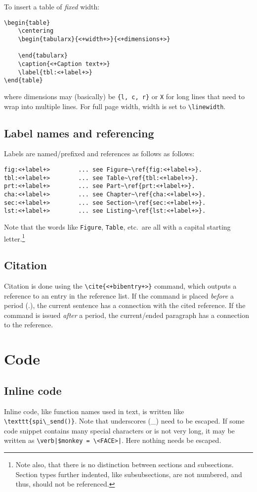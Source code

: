 To insert a table of \emph{fixed} width:
\begin{verbatim}
\begin{table}
    \centering
    \begin{tabularx}{<+width+>}{<+dimensions+>}

    \end{tabularx}
    \caption{<+Caption text+>}
    \label{tbl:<+label+>}
\end{table}
\end{verbatim}
where dimensions may (basically) be \texttt{\{l, c, r\}} or \texttt{X} for long lines that need to wrap into multiple lines. For full page width, width is set to \verb|\linewidth|.


\subsection{Label names and referencing}
Labels are named\slash prefixed and references as follows as follows:
\begin{verbatim}
fig:<+label+>        ... see Figure~\ref{fig:<+label+>}. 
tbl:<+label+>        ... see Table~\ref{tbl:<+label+>}.
prt:<+label+>        ... see Part~\ref{prt:<+label+>}.
cha:<+label+>        ... see Chapter~\ref{cha:<+label+>}.
sec:<+label+>        ... see Section~\ref{sec:<+label+>}.
lst:<+label+>        ... see Listing~\ref{lst:<+label+>}.
\end{verbatim}
Note that the words like \texttt{Figure}, \texttt{Table}, etc.\ are all with a capital starting letter.\footnote{Note also, that there is no distinction between sections and subsections. Section types further indented, like subsubsections, are not numbered, and thus, should not be referenced.}


\subsection{Citation}
Citation is done using the \verb|\cite{<+bibentry+>}| command, which outputs a reference to an entry in the reference list. If the command is placed \emph{before} a period (.), the current sentence has a connection with the cited reference. If the command is issued \emph{after} a period, the current\slash ended paragraph has a connection to the reference.


\section{Code}
\label{sec:code}
\subsection{Inline code}
Inline code, like function names used in text, is written like \verb|\texttt{spi\_send()}|. Note that underscores (\_) need to be escaped. If some code snippet contains many special characters or is not very long, it may be written as \verb#\verb|$monkey = \<FACE>|#. Here nothing needs be escaped.



